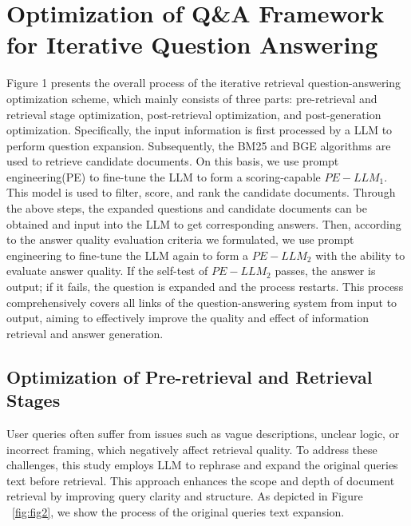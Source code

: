 \section{Optimization of Q\&A Framework for Iterative  Question Answering}


Figure 1 presents the overall process of the iterative retrieval question-answering optimization scheme, which mainly consists of three parts: pre-retrieval and retrieval stage optimization, post-retrieval optimization, and post-generation optimization. Specifically, the input information is first processed by a LLM to perform question expansion. Subsequently, the BM25 and BGE algorithms are used to retrieve candidate documents. On this basis, we use prompt engineering(PE) to fine-tune the LLM to form a scoring-capable $PE-LLM_1$. This model is used to filter, score, and rank the candidate documents. Through the above steps, the expanded questions and candidate documents can be obtained and input into the LLM to get corresponding answers. Then, according to the answer quality evaluation criteria we formulated, we use prompt engineering to fine-tune the LLM again to form a $PE-LLM_2$ with the ability to evaluate answer quality. If the self-test of $PE-LLM_2$ passes, the answer is output; if it fails, the question is expanded and the process restarts. This process comprehensively covers all links of the question-answering system from input to output, aiming to effectively improve the quality and effect of information retrieval and answer generation.

\subsection{Optimization of Pre-retrieval and Retrieval Stages}
\label{sec: eff_tt}
User queries often suffer from issues such as vague descriptions, unclear logic, or incorrect framing, which negatively affect retrieval quality. To address these challenges, this study employs LLM to rephrase and expand the original queries text before retrieval. This approach enhances the scope and depth of document retrieval by improving query clarity and structure. As depicted in Figure ~\ref{fig:fig2}, we show the process of the original queries text expansion.

